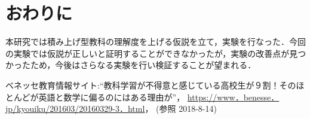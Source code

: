 \documentclass[twocolumn,10pt,a4j]{jsarticle}
\begin{document}
\section{おわりに}
本研究では積み上げ型教科の理解度を上げる仮説を立て，実験を行なった．今回の実験では仮説が正しいと証明することができなかったが，実験の改善点が見つかったため，今後はさらなる実験を行い検証することが望まれる．

\begin{thebibliography}{99}
ベネッセ教育情報サイト:“教科学習が不得意と感じている高校生が９割！そのほとんどが英語と数学に偏るのにはある理由が”， \url{https://www．benesse．jp/kyouiku/201603/20160329-3．html}， (参照 2018-8-14)
\end{thebibliography}
\end{document}
